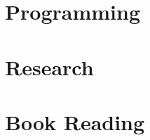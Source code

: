 \documentclass{scinote}
\begin{document}
\part{Programming}




\part{Research}


\part{Book Reading}


\begin{appendices}
	
\end{appendices}

\backmatter


\printbibliography[heading=bibintoc]
\printindex
\end{document}
